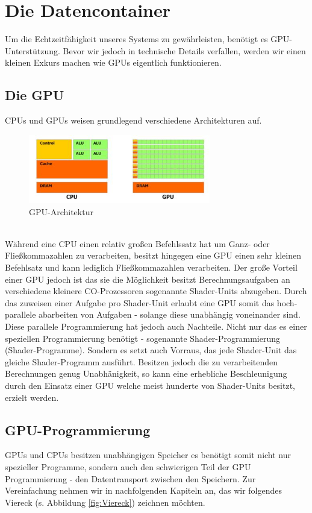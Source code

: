 \section{Die Datencontainer}
\begin{Spacing}{\mylinespace}
Um die Echtzeitfähigkeit unseres Systems zu gewährleisten, benötigt es GPU-Unterstützung.
Bevor wir jedoch in technische Details verfallen, werden wir einen kleinen Exkurs machen wie GPUs eigentlich funktionieren.
\subsection{Die GPU}
CPUs und GPUs weisen grundlegend verschiedene Architekturen auf.
\begin{figure}[h!]
	\vspace*{20px}
	\centering
	\includegraphics[width=300px]{graphics/GPUvsCPU.jpg}	
	\caption{GPU-Architektur\protect\footnotemark}
	\label{fig:GPUvsCPU}
\end{figure}
\\
Während eine CPU einen relativ großen Befehlssatz hat um Ganz- oder Fließkommazahlen zu verarbeiten, besitzt hingegen eine GPU einen sehr kleinen Befehlsatz und kann lediglich Fließkommazahlen verarbeiten.
Der große Vorteil einer GPU jedoch ist das sie die Möglichkeit besitzt Berechnungsaufgaben an verschiedene kleinere CO-Prozessoren sogenannte Shader-Units abzugeben.
Durch das zuweisen einer Aufgabe pro Shader-Unit erlaubt eine GPU somit das hoch-parallele abarbeiten von Aufgaben - solange diese unabhängig voneinander sind.
Diese parallele Programmierung hat jedoch auch Nachteile.
Nicht nur das es einer speziellen Programmierung benötigt - sogenannte Shader-Programmierung (Shader-Programme).
Sondern es setzt auch Vorraus, das jede Shader-Unit das gleiche Shader-Programm ausführt.
Besitzen jedoch die zu verarbeitenden Berechnungen genug Unabhänigkeit, so kann eine erhebliche Beschleunigung durch den Einsatz einer GPU welche meist hunderte von Shader-Units besitzt, erzielt werden.


\subsection{GPU-Programmierung}
GPUs und CPUs besitzen unabhängigen Speicher es benötigt somit nicht nur spezieller Programme, sondern auch den schwierigen Teil der GPU Programmierung - den Datentransport zwischen den Speichern.
Zur Vereinfachung nehmen wir in nachfolgenden Kapiteln an, das wir folgendes Viereck (s. Abbildung \ref{fig:Viereck}) zeichnen möchten.


\end{Spacing}
